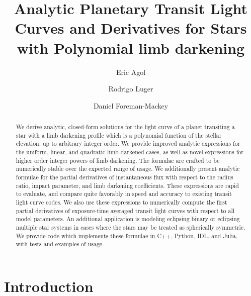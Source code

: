 \documentclass[modern]{aastex61}
\begin{document}

\setlength{\abovedisplayskip}{1.5em}
\setlength{\belowdisplayskip}{1.5em}

\title{%
Analytic Planetary Transit Light Curves and Derivatives for Stars with Polynomial limb darkening
}


\author[0000-0002-0802-9145]{Eric Agol}
\author[0000-0002-0296-3826]{Rodrigo Luger}
\author[0000-0002-9328-5652]{Daniel Foreman-Mackey}


\begin{abstract}
 We derive analytic, closed-form solutions for the light curve of a planet
 transiting a star with a limb darkening profile which is a polynomial function
 of the stellar elevation, up to arbitrary integer order. 
 We provide improved analytic expressions for the uniform, linear, and quadratic
 limb-darkened cases, as well as novel expressions for higher order integer powers 
 of limb darkening.  The formulae are crafted to be numerically stable over the 
 expected range of usage.  We additionally present analytic formulae for
 the partial derivatives of instantaneous flux with respect to the radius ratio,
 impact parameter, and limb darkening coefficients.  These expressions are rapid to
 evaluate, and compare quite favorably in speed and accuracy to existing transit light
 curve codes. We also use these expressions to numerically compute the first partial 
 derivatives of exposure-time averaged transit light curves with respect to all 
 model parameters.  An additional application is modeling eclipsing binary or
 eclipsing multiple star systems in cases where the stars may be treated as spherically 
 symmetric.  We provide code which implements these formulae in C++, Python, IDL, and Julia, 
 with tests and examples of usage.
\end{abstract}

%
\section{Introduction}
\label{sec:intro}
\end{document}
